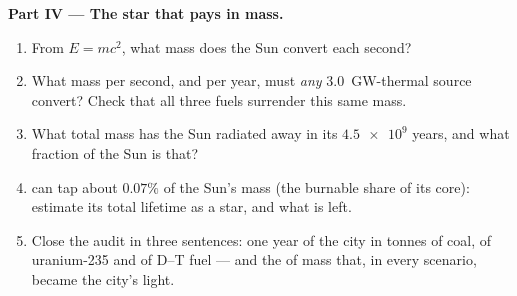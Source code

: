 \begin{problem}
\medskip
\noindent\textbf{Part IV --- The star that pays in mass.}
\begin{enumerate}[resume]
  \item From $E = mc^2$, what mass does the Sun convert each second?
  \item What mass per second, and per year, must \emph{any}
        \qty{3.0}{GW}-thermal source convert? Check that all three fuels
        surrender this same mass.
  \item What total mass has the Sun radiated away in its $\num{4.5e9}$
        years, and what fraction of the Sun is that?
  \item {} can tap about $0.07\%$ of the Sun's mass (the burnable share of
        its core): estimate its total lifetime as a star, and what is left.
  \item Close the audit in three sentences: one year of the city in tonnes
        of coal,  of uranium-235 and  of D--T fuel --- and
        the  of mass that, in every scenario, became the city's light.
\end{enumerate}
\end{problem}
